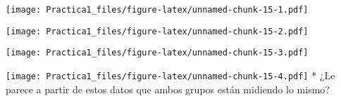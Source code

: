 \documentclass[
]{article}
\newenvironment{Shaded}{\begin{snugshade}}{\end{snugshade}}
\newcommand{\AttributeTok}[1]{\textcolor[rgb]{0.77,0.63,0.00}{#1}}
\newcommand{\FunctionTok}[1]{\textcolor[rgb]{0.00,0.00,0.00}{#1}}
\newcommand{\NormalTok}[1]{#1}
\newcommand{\SpecialCharTok}[1]{\textcolor[rgb]{0.00,0.00,0.00}{#1}}
\newcommand{\StringTok}[1]{\textcolor[rgb]{0.31,0.60,0.02}{#1}}
\begin{document}
\texttt{[image: Practica1\_files/figure-latex/unnamed-chunk-15-1.pdf]}

\begin{Shaded}
\end{Shaded}

\texttt{[image: Practica1\_files/figure-latex/unnamed-chunk-15-2.pdf]}

\begin{Shaded}
\end{Shaded}

\texttt{[image: Practica1\_files/figure-latex/unnamed-chunk-15-3.pdf]}

\begin{Shaded}
\end{Shaded}

\texttt{[image: Practica1\_files/figure-latex/unnamed-chunk-15-4.pdf]} *
¿Le parece a partir de estos datos que ambos grupos están midiendo lo
mismo?
\end{document}
